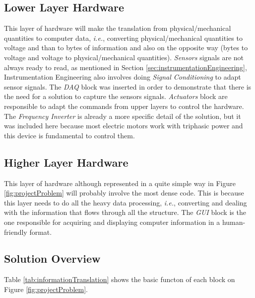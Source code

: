 	\subsection{Lower Layer Hardware}\label{ssec:lowerLayerlHardware}

		This layer of hardware will make the translation from physical/mechanical quantities to computer data, \textit{i.e.}, converting physical/mechanical quantities to voltage and than to bytes of information and also on the opposite way (bytes to voltage and voltage to physical/mechanical quantities). \textit{Sensors} signals are not always ready to read, as mentioned in Section \ref{sec:instrumentationEngineering}, Instrumentation Engineering also involves doing \textit{Signal Conditioning} to adapt sensor signals. The \textit{DAQ} block was inserted in order to demonstrate that there is the need for a solution to capture the sensors signals. \textit{Actuators} block are responsible to adapt the commands from upper layers to control the hardware. The \textit{Frequency Inverter} is already a more specific detail of the solution, but it was included here because most electric motors work with triphasic power and this device is fundamental to control them.

	\subsection{Higher Layer Hardware}\label{ssec:higherLayerlHardware}
	
		This layer of hardware although represented in a quite simple way in Figure \ref{fig:projectProblem} will probably involve the most dense code. This is because this layer needs to do all the heavy data processing, \textit{i.e.}, converting and dealing with the information that flows through all the structure. The \textit{GUI} block is the one responsible for acquiring and displaying computer information in a human-friendly format.

	\subsection{Solution Overview}\label{ssec:solutionOverview}

	Table \ref{tab:informationTranslation} shows the basic functon of each block on Figure \ref{fig:projectProblem}.

